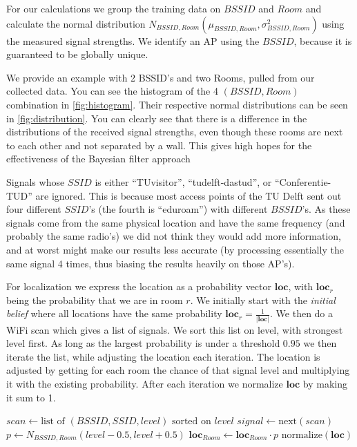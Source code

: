 \documentclass[a4paper,10pt,twoside]{IEEEtran}
\begin{document}
For our calculations we group the training data on $BSSID$ and $Room$ and calculate the normal distribution $N_{BSSID,Room}(\mu_{BSSID,Room}, \sigma^2_{BSSID,Room})$ using the measured signal strengths. We identify an AP using the $BSSID$, because it is guaranteed to be globally unique.

We provide an example with 2 BSSID's and two Rooms, pulled from our collected data.
You can see the histogram of the 4 $(BSSID, Room)$ combination in \autoref{fig:histogram}.
Their respective normal distributions can be seen in \autoref{fig:distribution}.
 You can clearly see that there is a difference in the distributions of the received signal strengths, even though these rooms are next to each other and not separated by a wall.
 This gives high hopes for the effectiveness of the Bayesian filter approach

Signals whose $SSID$ is either ``TUvisitor'', ``tudelft-dastud'',
or ``Conferentie-TUD'' are ignored.
This is because most access points of the TU Delft sent out four different $SSID$'s (the fourth is ``eduroam'') with different $BSSID$'s.
As these signals come from the same physical location and have the same
frequency (and probably the same radio's) we did not think they would add more
information, and at worst might make our results less accurate (by processing
essentially the same signal 4 times, thus biasing the results heavily on those AP's).

For localization we express the location as a probability vector $\mathbf{loc}$, with $\mathbf{loc}_{r}$ being the probability that we are in room $r$. 
We initially start with the \emph{initial belief} where all locations have the same probability $\mathbf{loc}_r = \frac{1}{|\mathbf{loc}|}$.
We then do a WiFi scan which gives a list of signals.
We sort this list on level, with strongest level first.
As long as the largest probability is under a threshold $0.95$ we then iterate the list, while adjusting the location each iteration.
The location is adjusted by getting for each room the chance of that signal level and multiplying it with the existing probability. After each iteration we normalize $\mathbf{loc}$ by making it sum to 1.
\\
\begin{algorithmic}
	\State $scan \gets \text{list of } (BSSID, SSID, level) \text{ sorted on }level$
		\State $signal \gets \text{next}\left(scan\right)$
			\State $p \gets N_{BSSID,Room}(level-0.5,level+0.5)$
			\State $\mathbf{loc}_{Room} \gets \mathbf{loc}_{Room} \cdot p $
		\EndFor
		\State $\text{normalize}\left(\mathbf{loc}\right)$
	\EndWhile
\end{algorithmic}
\end{document}
